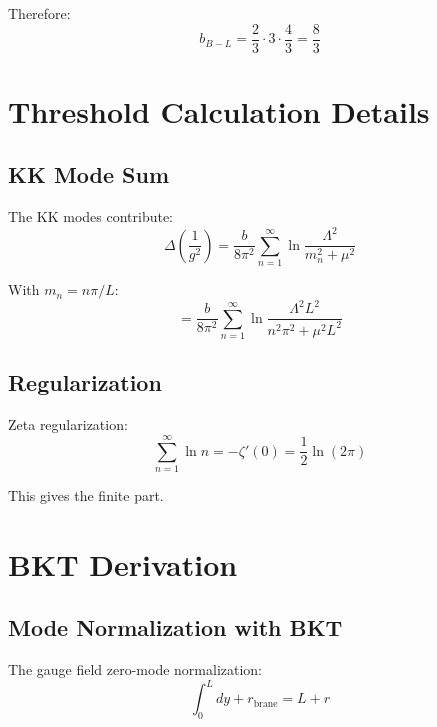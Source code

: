 \documentclass[11pt,a4paper]{article}
\begin{document}
Therefore:
\begin{equation}
\label{eq:b-bl-final}
b_{B-L} = \frac{2}{3} \cdot 3 \cdot \frac{4}{3} = \frac{8}{3}
\end{equation}

\section{Threshold Calculation Details}
\label{app:threshold}

\subsection{KK Mode Sum}
\label{app:kk-sum}

The KK modes contribute:
\begin{equation}
\label{eq:kk-contribution}
\Delta\left(\frac{1}{g^2}\right) = \frac{b}{8\pi^2} \sum_{n=1}^{\infty} \ln\frac{\Lambda^2}{m_n^2 + \mu^2}
\end{equation}

With $m_n = n\pi/L$:
\begin{equation}
\label{eq:kk-sum-explicit}
= \frac{b}{8\pi^2} \sum_{n=1}^{\infty} \ln\frac{\Lambda^2 L^2}{n^2\pi^2 + \mu^2 L^2}
\end{equation}

\subsection{Regularization}
\label{app:regularization}

Zeta regularization:
\begin{equation}
\label{eq:zeta-reg-app}
\sum_{n=1}^{\infty} \ln n = -\zeta'(0) = \frac{1}{2}\ln(2\pi)
\end{equation}

This gives the finite part.

\section{BKT Derivation}
\label{app:bkt}

\subsection{Mode Normalization with BKT}
\label{app:mode-norm}

The gauge field zero-mode normalization:
\begin{equation}
\label{eq:zero-mode-norm}
\int_0^L dy + r_{\text{brane}} = L + r
\end{equation}
\end{document}
